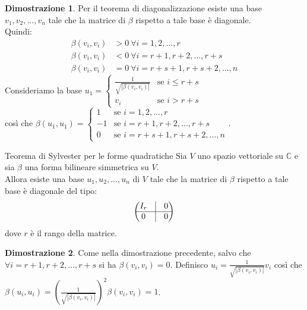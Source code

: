 \documentclass[a4paper]{article}
\theoremstyle{definition}
\newtheorem*{dimm}{Dimostrazione}
\begin{document}
	\begin{dimm}
		Per il teorema di diagonalizzazione esiste una base $v_1, v_2, ..., v_n$ tale che la matrice di $\beta$ rispetto a tale base è diagonale. \\
		Quindi:
		\begin{align*}
			\beta(v_i, v_i) &> 0 \ \forall i = 1, 2, ..., r \\
			\beta(v_i, v_i) &< 0 \ \forall i = r + 1, r + 2, ..., r + s \\
			\beta(v_i, v_i) &= 0 \ \forall i = r + s + 1, r + s + 2, ..., n
		\end{align*}
		Consideriamo la base $u_1 = \begin{cases}
			\frac{1}{\sqrt{|\beta(v_i, v_i)|}} & \text{se } i \le r + s \\
			v_i & \text{se } i > r + s
		\end{cases}$ \\
		così che $\beta(u_1, u_1) = \begin{cases}
			1 & \text{se } i = 1, 2, ..., r \\
			-1 & \text{se } i = r + 1, r + 2, ..., r + s \\
			0 & \text{se } i = r + s + 1, r + s + 2, ..., n
		\end{cases}$.
	\end{dimm}


	\begin{teo}{Teorema di Sylvester per le forme quadratiche}{}
		Sia $V$ uno spazio vettoriale su $\mathbb{C}$ e sia $\beta$ una forma bilineare simmetrica su $V$. \\
		Allora esiste una base $u_1, u_2, ..., u_n$ di $V$ tale che la matrice di $\beta$ rispetto a tale base è diagonale del tipo:
		\begin{align*}
			\begin{pmatrix}
				I_r & \vline & 0 \\
				\hline
				0 & \vline & 0
			\end{pmatrix}
		\end{align*}
		dove $r$ è il rango della matrice.
	\end{teo}

	\begin{dimm}
		Come nella dimostrazione precedente, salvo che $\forall i = r + 1, r + 2, ..., r + s$ si ha $\beta(v_i, v_i) = 0$.
		Definisco $u_i = \frac{1}{\sqrt{|\beta(v_i, v_i)|}}v_i$ così che $\beta(u_i, u_i) = (\frac{1}{\sqrt{|\beta(v_i, v_i)|}})^2\beta(v_i, v_i) = 1$.
	\end{dimm}
\end{document}
